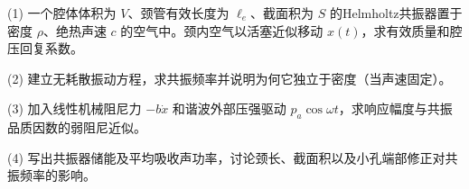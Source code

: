 (1) 一个腔体体积为 \(V\)、颈管有效长度为 \(\ell_e\)、截面积为 \(S\) 的Helmholtz共振器置于密度 \(\rho\)、绝热声速 \(c\) 的空气中。颈内空气以活塞近似移动 \(x(t)\)，求有效质量和腔压回复系数。

(2) 建立无耗散振动方程，求共振频率并说明为何它独立于密度（当声速固定）。

(3) 加入线性机械阻尼力 \(-b\dot x\) 和谐波外部压强驱动 \(p_a\cos\omega t\)，求响应幅度与共振品质因数的弱阻尼近似。

(4) 写出共振器储能及平均吸收声功率，讨论颈长、截面积以及小孔端部修正对共振频率的影响。
